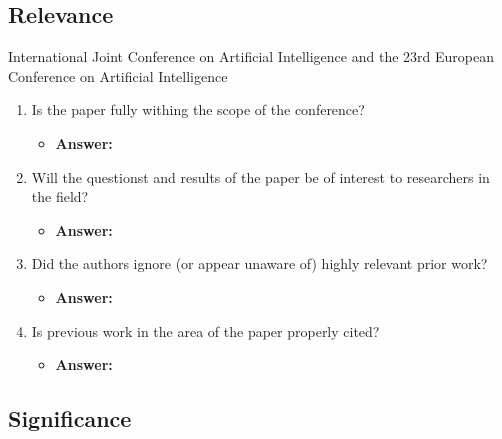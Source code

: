 \documentclass[a4paper]{article}
\begin{document}
\subsection{Relevance}


International Joint Conference on Artificial Intelligence and the 23rd European Conference on Artificial Intelligence

\begin{enumerate}[label=(\alph*)]
	\item Is the paper fully withing the scope of the conference?
		\begin{itemize}
			\item \textbf{Answer:}	
		\end{itemize}				
		
		
	\item Will the questionst and results of the paper be of interest to researchers in the field?
		\begin{itemize}
			\item \textbf{Answer:}	
		\end{itemize}			
	
	
	\item Did the authors ignore (or appear unaware of) highly relevant prior work?
		\begin{itemize}
			\item \textbf{Answer:}	
		\end{itemize}			
	
	\item Is previous work in the area of the paper properly cited?
		\begin{itemize}
			\item \textbf{Answer:}	
		\end{itemize}		
\end{enumerate}


\subsection{Significance}
\end{document}
